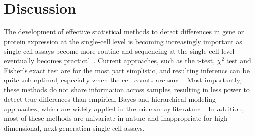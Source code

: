 \documentclass[12pt,oupdraft]{biostatistics}
\begin{document}
%

\section{Discussion}
\label{s:discussion}
The development of effective statistical methods to detect differences in gene or protein expression at the single-cell level is becoming increasingly important as single-cell assays become more routine and  sequencing at the single-cell level eventually becomes practical~\citep{Ramskold:2012gj}. Current approaches, such as the t-test, $\chi^2$ test and Fisher's exact test are for the most part simplistic, and resulting inference can be quite sub-optimal, especially when the cell counts are small. Most importantly, these methods do not share information across samples, resulting in less power to detect true differences than empirical-Bayes and hierarchical modeling approaches, which are widely applied in the microarray literature~\citep{Newton2004,Gottardo:2006,Lo2007}. In addition, most of these methods are univariate in nature and inappropriate for high-dimensional, next-generation single-cell assays.
\end{document}
